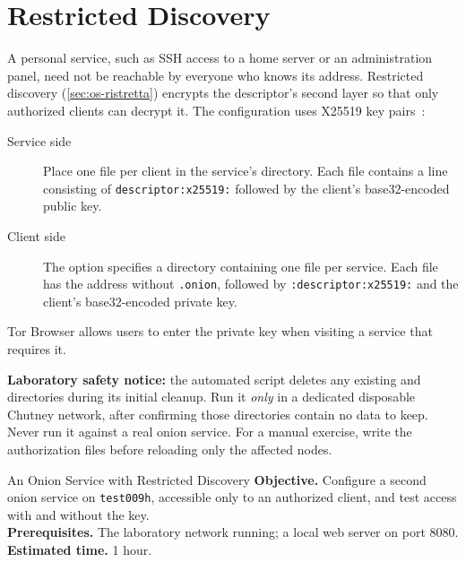 \section{Restricted Discovery}\label{sec:onionp-ristretta}

A personal service, such as SSH access to a home server or an administration panel, need not be reachable by everyone who knows its address. Restricted discovery (\cref{sec:os-ristretta}) encrypts the descriptor's second layer so that only authorized clients can decrypt it. The configuration uses X25519 key pairs~\cite{torspec}:
\begin{description}
  \item[Service side] Place one  file per client in the service's  directory. Each file contains a line consisting of \texttt{descriptor:\allowbreak x25519:} followed by the client's base32-encoded public key.
  \item[Client side] The  option specifies a directory containing one  file per service. Each file has the address without \texttt{.onion}, followed by \texttt{:\allowbreak descriptor:\allowbreak x25519:} and the client's base32-encoded private key.
\end{description}
Tor Browser allows users to enter the private key when visiting a service that requires it.

\textbf{Laboratory safety notice:} the automated script  deletes any existing  and  directories during its initial cleanup. Run it \emph{only} in a dedicated disposable Chutney network, after confirming those directories contain no data to keep. Never run it against a real onion service. For a manual exercise, write the authorization files before reloading only the affected nodes.

\begin{laboratorio}[13]{An Onion Service with Restricted Discovery}
\textbf{Objective.} Configure a second onion service on \texttt{test009h}, accessible only to an authorized client, and test access with and without the key.\\
\textbf{Prerequisites.} The laboratory network running; a local web server on port 8080.\\
\textbf{Estimated time.} 1 hour.
\end{laboratorio}

